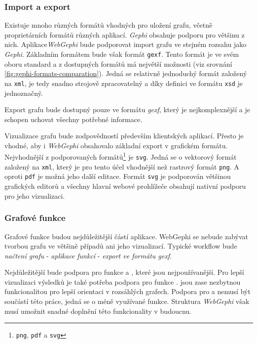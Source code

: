 \documentclass[thesis=M,czech]{FITthesis}[2014/05/6]
\begin{document}
\subsubsection{Import a export}
Existuje mnoho různých formátů vhodných pro uložení grafu, včetně proprietárních formátů různých aplikací. \textit{Gephi} obsahuje podporu
pro většinu z nich. Aplikace\textit{WebGephi} bude podporovat import grafu ve stejném rozsahu jako \textit{Gephi}.
Základním formátem bude však formát \texttt{gexf}. Tento formát je ve svém oboru standard a z dostupných formátů
má největší možnosti (viz srovnání \ref{fig:gephi-formats-comparation}). Jedná se relativně jednoduchý formát založený na \texttt{xml}, je 
tedy snadno strojově zpracovatelný a díky definici ve formátu \texttt{xsd} je jednoznačný. 

Export grafu bude dostupný pouze ve formátu \textit{gexf}, který je nejkomplexnější a je schopen uchovat všechny potřebné informace.

Vizualizace grafu bude zodpovědností především klientských aplikací. Přesto je vhodné, aby i \textit{WebGephi} obsahovalo základní export v grafickém formátu.
Nejvhodnější z podporovaných formátů\footnote{\texttt{png}, \texttt{pdf} a \texttt{svg}} je \texttt{svg}. Jedná se o vektorový formát založený na \texttt{xml}, který je pro tento účel
vhodnější než rastrový formát \texttt{png}. A oproti \texttt{pdf} je možná jeho další editace. Formát \texttt{svg} je podporován většinou grafických editorů a všechny
hlavní webové prohlížeče obsahují nativní podporu pro jeho vizualizaci.

\subsubsection{Grafové funkce}
Grafové funkce budou nejdůležitější částí aplikace. WebGephi se nebude zabývat tvorbou grafu ve většině případů ani jeho vizualizací. Typické workflow 
bude \textit{načtení grafu} - \textit{aplikace funkcí} - \textit{export ve formátu gexf}.

Nejdůležitější bude podpora pro funkce  a , které jsou nejpoužívanější. Pro lepší vizualizaci výsledků
je také potřeba podpora pro funkce .  jsou zase nezbytnou funkcionalitou pro lepší orientaci v rozsáhlých grafech.
Podpora pro  a  nemusí být součástí 
této práce, jedná se o méně využívané funkce. Struktura \textit{WebGephi} však musí umožnit snadné doplnění této funkcionality v budoucnu.
\end{document}
